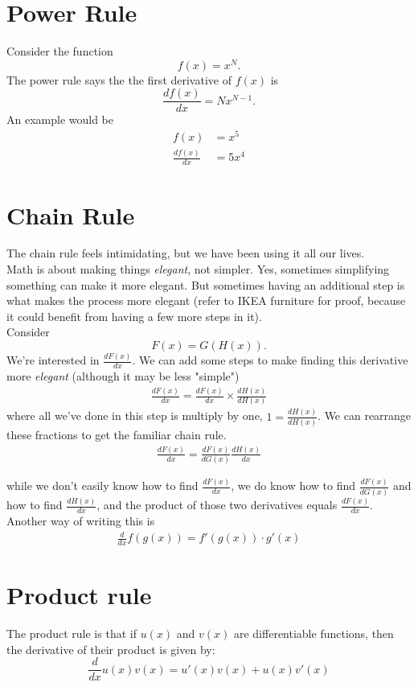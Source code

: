 \documentclass{article}
\begin{document}
\section{Power Rule}
Consider the function \[f(x) = x^N.\] The power rule says the the first derivative of $f(x)$ is 
\[\frac{d f(x)}{dx} = N x^{N-1}.\]
An example would be 
\begin{align}
    f(x) &= x^5 \\
    \frac{df(x)}{dx} &= 5x^4
\end{align} 

\section{Chain Rule}
The chain rule feels intimidating, but we have been using it all our lives. \\

Math is about making things \textit{elegant}, not simpler. Yes, sometimes simplifying something can make it more elegant. But sometimes having an additional step is what makes the process more elegant (refer to IKEA furniture for proof, because it could benefit from having a few more steps in it). \\

Consider \[F(x) = G(H(x)).\] We're interested in $\frac{dF(x)}{dx}$. We can add some steps to make finding this derivative more \textit{elegant} (although it may be less "simple")
\begin{align}
    \frac{dF(x)}{dx}  = \frac{dF(x)}{dx} \times \frac{dH(x)}{d H(x)}
\end{align}
where all we've done in this step is multiply by one, $1 = \frac{dH(x)}{d H(x)}$. We can rearrange these fractions to get the familiar chain rule. 
\begin{align}
    \frac{dF(x)}{dx}  = \frac{dF(x)}{dG(x)}  \frac{dH(x)}{d x}
\end{align}

while we don't easily know how to find $\frac{dF(x)}{dx}$, we do know how to find $\frac{dF(x)}{dG(x)}$ and how to find $ \frac{dH(x)}{d x}$, and the product of those two derivatives equals $\frac{dF(x)}{dx}$. \\

Another way of writing this is 
\begin{align}
    \frac{d}{dx} f(g(x)) = f'(g(x)) \cdot g'(x)
\end{align}

\section{Product rule}
The product rule is that if $u(x)$ and $v(x)$ are differentiable functions, then the derivative of their product is given by:
\[
\frac{d}{dx} u(x)v(x) = u'(x)v(x) + u(x)v'(x)
\]
\end{document}

